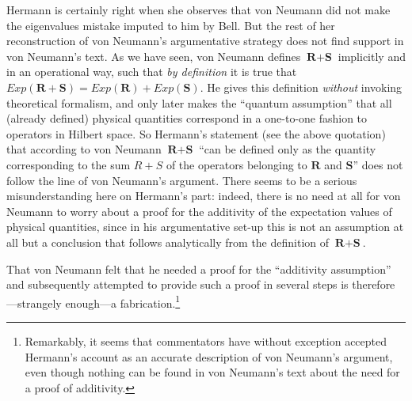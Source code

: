 \documentclass[11pt]{article}
\begin{document}
Hermann is certainly right when she observes that von Neumann did not make the eigenvalues mistake imputed to him by Bell. But the rest of her reconstruction of von Neumann's argumentative strategy does not find support in von Neumann's text. As we have seen, von Neumann defines $\textbf{R} + \textbf{S}$ implicitly and in an operational way, such that \emph{by definition} it is true that $Exp(\textbf{R} + \textbf{S}) = Exp(\textbf{R}) + Exp(\textbf{S})$. He gives this definition \emph{without} invoking theoretical formalism, and only later makes the ``quantum assumption'' that all (already defined) physical quantities correspond in a one-to-one fashion to operators in Hilbert space. So Hermann's statement (see the above quotation) that according to von Neumann $\textbf{R} + \textbf{S}$ ``can be defined only as the quantity corresponding to the sum $R + S$ of the operators belonging to $\textbf{R}$ and $\textbf{S}$'' does not follow the line of von Neumann's argument. There seems to be a serious misunderstanding here on Hermann's part: indeed, there is no need at all for von Neumann to worry about a proof for the additivity of the expectation values of physical quantities, since in his argumentative set-up this is not an assumption at all but a conclusion  that follows analytically from the definition of $\textbf{R} + \textbf{S}$.

That von Neumann felt that he needed a proof for the ``additivity assumption'' and subsequently attempted to provide such a proof in several steps is therefore---strangely enough---a fabrication.\footnote{Remarkably, it seems that commentators have without exception accepted Hermann's account as an accurate description of von Neumann's argument, even though nothing can be found in von Neumann's text about the need for a proof of additivity.}
\end{document}

